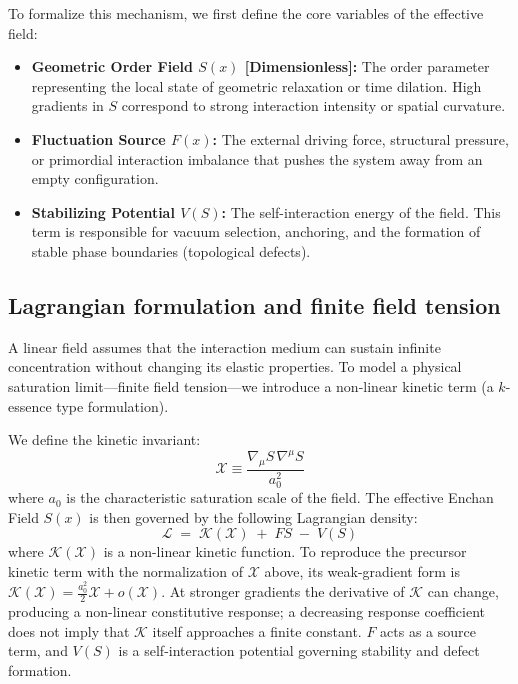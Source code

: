 \documentclass[11pt,a4paper]{article}
\begin{document}
To formalize this mechanism, we first define the core variables of the effective field:
\begin{itemize}
    \item \textbf{Geometric Order Field $S(x)$ [Dimensionless]:} The order parameter representing the local state of geometric relaxation or time dilation. High gradients in $S$ correspond to strong interaction intensity or spatial curvature.
    \item \textbf{Fluctuation Source $F(x)$:} The external driving force, structural pressure, or primordial interaction imbalance that pushes the system away from an empty configuration.
    \item \textbf{Stabilizing Potential $V(S)$:} The self-interaction energy of the field. This term is responsible for vacuum selection, anchoring, and the formation of stable phase boundaries (topological defects).
\end{itemize}

\subsection{Lagrangian formulation and finite field tension}
A linear field assumes that the interaction medium can sustain infinite concentration without changing its elastic properties. To model a physical saturation limit---finite field tension---we introduce a non-linear kinetic term (a $k$-essence type formulation). 

We define the kinetic invariant:
\begin{equation}
\mathcal{X} \equiv \frac{\nabla_\mu S\,\nabla^\mu S}{a_0^2}
\end{equation}
where $a_0$ is the characteristic saturation scale of the field. The effective Enchan Field $S(x)$ is then governed by the following Lagrangian density:
\begin{equation}
\mathcal{L} \;=\;
\mathcal{K}(\mathcal{X})
\;+\; F S
\;-\; V(S)
\label{eq:Lagrangian}
\end{equation}
where $\mathcal{K}(\mathcal{X})$ is a non-linear kinetic function. To reproduce the precursor kinetic term with the normalization of $\mathcal{X}$ above, its weak-gradient form is $\mathcal{K}(\mathcal{X})=\tfrac{a_0^2}{2}\mathcal{X}+o(\mathcal{X})$. At stronger gradients the derivative of $\mathcal{K}$ can change, producing a non-linear constitutive response; a decreasing response coefficient does not imply that $\mathcal{K}$ itself approaches a finite constant. $F$ acts as a source term, and $V(S)$ is a self-interaction potential governing stability and defect formation.
\end{document}
